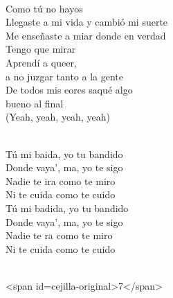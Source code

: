 \begin{cancion}[Te Regalo][Rels B]
	\jump\\
	Como tú no hayos\\
Llegaste a mi vida y cambió mi suerte\\
	Me enseñaste a miar donde en verdad\\
Tengo que mirar\\
	Aprendí a queer, \\
a no juzgar tanto a la gente\\
	De todos mis eores saqué algo\\
bueno al final\\
(Yeah, yeah, yeah, yeah)\\\jump\\
	\begin{chorus}%
	Tú mi baida, yo tu bandido\\
Donde vaya’, ma, yo te sigo\\
	Nadie te ira como te miro\\
Ni te cuida como te cuido\\
	Tú mi badida, yo tu bandido\\
Donde vaya’, ma, yo te sigo\\
	Nadie te ra como te miro\\
	Ni te cuida como te cuido \\
	\end{chorus}%
	\jump\\
<span id=cejilla-original>7</span>\\
\end{cancion}%
